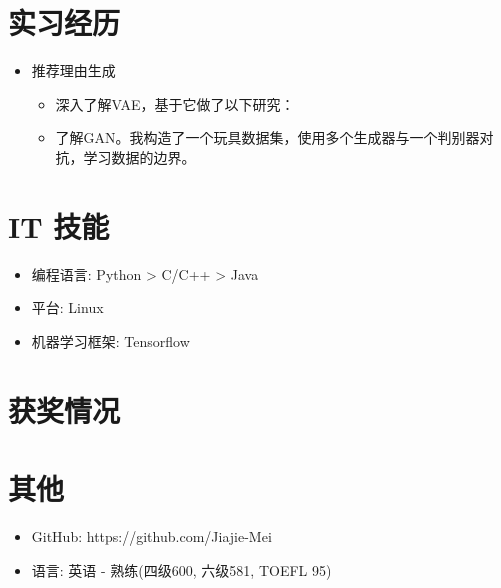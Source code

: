 \documentclass{resume}
\begin{document}
\section{实习经历}
\begin{itemize}
\item 推荐理由生成
\begin{itemize}
	\item 深入了解VAE，基于它做了以下研究：
\item 了解GAN。我构造了一个玩具数据集，使用多个生成器与一个判别器对抗，学习数据的边界。
\end{itemize}


\end{itemize}


\section{IT 技能}
\begin{itemize}[parsep=0.5ex]
  \item 编程语言: Python > C/C++ > Java
  \item 平台: Linux
  \item 机器学习框架: Tensorflow
\end{itemize}

\section{获奖情况}

\section{其他}
\begin{itemize}[parsep=0.5ex]
  \item GitHub: https://github.com/Jiajie-Mei
  \item 语言: 英语 - 熟练(四级600, 六级581, TOEFL 95)
\end{itemize}

%
%
\end{document}
